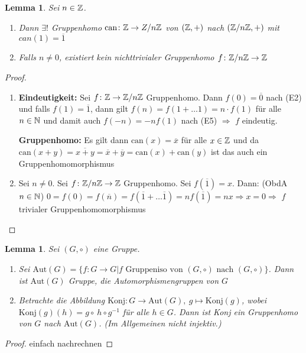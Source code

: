 \documentclass[12pt,a4paper]{article}
\newcounter{thmcounter}[subsection]
\theoremstyle{definition}
\theoremstyle{remark}
\theoremstyle{definition}
\theoremstyle{definition}
\theoremstyle{plain}
\theoremstyle{plain}
\newtheorem{lem}[thmcounter]{Lemma}
\begin{document}
\begin{lem}
	Sei $n\in \mathbb Z$.
	\begin{enumerate}
		\item Dann $\exists!$ Gruppenhomo $\mbox{can}\colon \mathbb Z\to Z/n\mathbb Z$ von $(\mathbb Z,+)$ nach $(\mathbb Z/n\mathbb Z,+)$ mit $can(1)=\overline{1}$
		\item Falls $n\neq 0$, existiert kein nichttrivialer Gruppenhomo $f\colon \mathbb Z/n\mathbb Z\to\mathbb Z$ 
	\end{enumerate}
\end{lem}
\begin{proof}
	\leavevmode
	\begin{enumerate}
		\item
	\textbf{Eindeutigkeit:} Sei $f\colon \mathbb Z\to \mathbb Z/n\mathbb Z$ Gruppenhomo. Dann $f(0)=\overline{0}$ nach (E2) und falls $f(1) = \overline{1}$, dann gilt $f(n)= f(1+\dots 1) = n\cdot f(1)$ für alle $n\in\mathbb N$ und damit auch $f(-n) = -nf(1)$ nach (E5) $\Rightarrow$ $f$ eindeutig.
	
	\noindent \textbf{Gruppenhomo:} Es gilt dann $\text{can}(x) = \overline{x}$ für alle $x\in\mathbb Z$ und da $\text{can}(x+y) = \overline{x+y} = \overline{x}+\overline{y} = \text{can}(x)+\text{can}(y)$ ist das auch ein Gruppenhomomorphismus
	
	\item Sei $n\neq 0$. Sei $f\colon \mathbb Z/n\mathbb Z\to \mathbb Z$ Gruppenhomo. Sei $f(\overline{1})= x$. Dann: (ObdA $n\in\mathbb N$) $0=f(0)=f(\overline{n})= f(\overline{1}+\dots \overline{1})=nf(\overline{1})= nx\Rightarrow x=0\Rightarrow$ $f$ trivialer Gruppenhomomorphismus
	\end{enumerate}
\end{proof}

\begin{lem}
	Sei $(G,\circ)$ eine Gruppe.
	\begin{enumerate}
		\item Sei $\text{Aut}(G) = \{f\colon G\to G| f \text{ Gruppeniso von $(G,\circ)$ nach }(G,\circ)\}$. Dann ist $\text{Aut}(G)$ Gruppe, die Automorphismengruppen von $G$
		\item Betrachte die Abbildung $\text{Konj}\colon G\to \text{Aut}(G) ,\ g\mapsto \text{Konj}(g)$, wobei $\text{Konj}(g)(h)= g\circ\ h\circ g^{-1}$ für alle $h\in G$. Dann ist Konj ein Gruppenhomo von $G$ nach $\text{Aut}(G)$. (Im Allgemeinen nicht injektiv.)
	\end{enumerate}
\end{lem}

\begin{proof}
	einfach nachrechnen
\end{proof}
\end{document}
